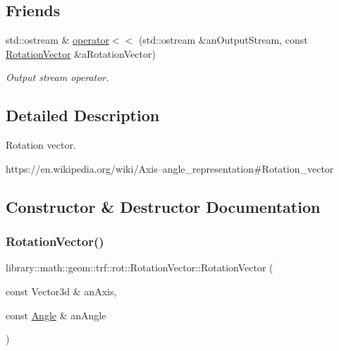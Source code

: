\subsection*{Friends}
\begin{DoxyCompactItemize}
\item 
std\+::ostream \& \hyperlink{classlibrary_1_1math_1_1geom_1_1trf_1_1rot_1_1_rotation_vector_aa66ba2fd706a441ee39d06857842ecfe}{operator$<$$<$} (std\+::ostream \&an\+Output\+Stream, const \hyperlink{classlibrary_1_1math_1_1geom_1_1trf_1_1rot_1_1_rotation_vector}{Rotation\+Vector} \&a\+Rotation\+Vector)
\begin{DoxyCompactList}\small\item\em Output stream operator. \end{DoxyCompactList}\end{DoxyCompactItemize}


\subsection{Detailed Description}
Rotation vector. 

https\+://en.wikipedia.\+org/wiki/\+Axis–angle\+\_\+representation\#\+Rotation\+\_\+vector 

\subsection{Constructor \& Destructor Documentation}
\mbox{\label{classlibrary_1_1math_1_1geom_1_1trf_1_1rot_1_1_rotation_vector_a32b1fab5e81bc24d777324daf5849205}} 
\subsubsection{\texorpdfstring{Rotation\+Vector()}{RotationVector()}}
{\footnotesize\ttfamily library\+::math\+::geom\+::trf\+::rot\+::\+Rotation\+Vector\+::\+Rotation\+Vector (\begin{DoxyParamCaption}\item[{const Vector3d \&}]{an\+Axis,  }\item[{const \hyperlink{classlibrary_1_1math_1_1geom_1_1_angle}{Angle} \&}]{an\+Angle }\end{DoxyParamCaption})}




